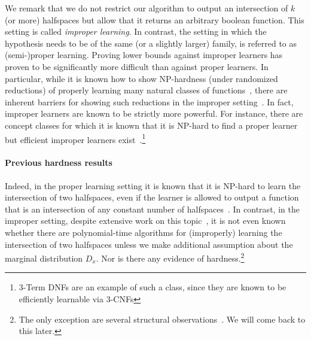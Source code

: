 \documentclass{theoretics}
\begin{document}
We remark that we do not restrict our algorithm to output an intersection of $k$ (or more) halfspaces but allow that it returns an arbitrary boolean function.
This setting is called \emph{improper learning}.
In contrast, the setting in which the hypothesis needs to be of the same (or a slightly larger) family, is referred to as (semi-)proper learning.
Proving lower bounds against improper learners has proven to be significantly more difficult than against proper learners.
In particular, while it is known how to show $\mathrm{NP}$-hardness (under randomized reductions) of properly learning many natural classes of functions~\cite{feldman2006optimal,feldman2006new,DBLP:conf/focs/GuruswamiR06, MR2644358-Gopalan10}, there are inherent barriers for showing such reductions in the improper setting~\cite{applebaum2008basing}.
In fact, improper learners are known to be strictly more powerful.
For instance, there are concept classes for which it is known that it is $\mathrm{NP}$-hard to find a proper learner but efficient improper learners exist~\cite{DBLP:journals/cacm/Valiant84,DBLP:journals/jacm/PittV88}.\footnote{3-Term DNFs are an example of such a class, since they are known to be efficiently learnable via 3-CNFs}

\paragraph{Previous hardness results}
Indeed, in the proper learning setting it is known that it is $\mathrm{NP}$-hard to learn the intersection of two halfspaces, even if the learner is allowed to output a function that is an intersection of any constant number of halfspaces~\cite{DBLP:conf/focs/AlekhnovichBFKP04}.
In contrast, in the improper setting, despite extensive work on this topic~\cite{klivans2004learning,DBLP:conf/focs/KlivansOS08,klivans2009baum,DBLP:conf/focs/Vempala10a,sherstov2010optimal,sherstov2021hardest}, it is not even known whether there are polynomial-time algorithms for (improperly) learning the intersection of two halfspaces unless we make additional assumption about the marginal distribution $D_x$.
Nor is there any evidence of hardness.\footnote{The only exception are several structural observations~\cite{sherstov2010optimal,sherstov2021hardest}. We will come back to this later.}
\end{document}
